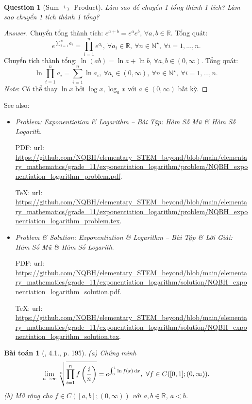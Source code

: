 \documentclass{article}
\newtheorem{baitoan}{Bài toán}
\newtheorem{question}{Question}
\begin{document}
\begin{question}[Sum $\leftrightarrows$ Product]
	Làm sao để chuyển 1 tổng thành 1 tích? Làm sao chuyển 1 tích thành 1 tổng?
\end{question}

\begin{proof}[Answer]
	Chuyển tổng thành tích: $e^{a + b} = e^ae^b$, $\forall a,b\in\mathbb{R}$. Tổng quát:
	\begin{equation*}
		e^{\sum_{i=1}^n a_i} = \prod_{i=1}^n e^{a_i},\ \forall a_i\in\mathbb{R},\ \forall n\in\mathbb{N}^\star,\ \forall i = 1,\ldots,n.
	\end{equation*}
	Chuyển tích thành tổng: $\ln(ab) = \ln a + \ln b$, $\forall a,b\in(0,\infty)$. Tổng quát:
	\begin{equation*}
		\ln\prod_{i=1}^n a_i = \sum_{i=1}^n \ln a_i,\ \forall a_i\in(0,\infty),\ \forall n\in\mathbb{N}^\star,\ \forall i = 1,\ldots,n.
	\end{equation*}
	{\it Note}: Có thể thay $\ln x$ bởi $\log x,\log_a x$ với $a\in(0,\infty)$ bất kỳ.
\end{proof}
See also:
\begin{itemize}
	\item {\it Problem: Exponentiation \& Logarithm -- Bài Tập: Hàm Số Mũ \& Hàm Số Logarith}.
	
	PDF: {\sc url}: \url{https://github.com/NQBH/elementary_STEM_beyond/blob/main/elementary_mathematics/grade_11/exponentiation_logarithm/problem/NQBH_exponentiation_logarithm_problem.pdf}.
	
	\TeX: {\sc url}: \url{https://github.com/NQBH/elementary_STEM_beyond/blob/main/elementary_mathematics/grade_11/exponentiation_logarithm/problem/NQBH_exponentiation_logarithm_problem.tex}.
	\item {\it Problem \& Solution: Exponentiation \& Logarithm -- Bài Tập \& Lời Giải: Hàm Số Mũ \& Hàm Số Logarith}.
	
	PDF: {\sc url}: \url{https://github.com/NQBH/elementary_STEM_beyond/blob/main/elementary_mathematics/grade_11/exponentiation_logarithm/solution/NQBH_exponentiation_logarithm_solution.pdf}.
	
	\TeX: {\sc url}: \url{https://github.com/NQBH/elementary_STEM_beyond/blob/main/elementary_mathematics/grade_11/exponentiation_logarithm/solution/NQBH_exponentiation_logarithm_solution.tex}.
\end{itemize}

\begin{baitoan}[\cite{Quoc_Long_Dat_Nam_VMC}, 4.1., p. 195]
	(a) Chứng minh
	\begin{equation*}
		\lim_{n\to\infty} \sqrt[n]{\prod_{i=1}^n f\left(\frac{i}{n}\right)} = e^{\int_0^1 \ln f(x)\,{\rm d}x},\ \forall f\in C([0,1];(0,\infty)).
	\end{equation*}
	(b) Mở rộng cho $f\in C([a,b];(0,\infty))$ với $a,b\in\mathbb{R}$, $a < b$.
\end{baitoan}
\end{document}
